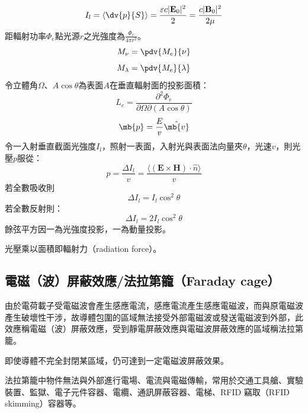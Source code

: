 \documentclass[a4paper,12pt]{report}
\begin{document}
\begin{itemize}
\eit
\[I_l=\langle\dv{p}{S}\rangle=\frac{\varepsilon c|\mathbf{E}_0|^2}{2}=\frac{c|\mathbf{B}_0|^2}{2\mu}\]
距輻射功率$\Phi_e$點光源$r$之光強度為$\frac{\Phi_e}{4\pi r^2}$。
\[M_{\nu}=\pdv{M_e}{\nu}\]
\[M_{\lambda}=\pdv{M_e}{\lambda}\]
令立體角$\Omega$、$A\cos\theta$為表面$A$在垂直輻射面的投影面積：
\[L_e=\frac{\partial^2\Phi_e}{\partial\Omega\partial(A\cos\theta)}\]
\[\mb{p}=\frac{E}{v}\hat{\mb{v}}\]
令一入射垂直截面光強度$I_l$，照射一表面，入射光與表面法向量夾$\theta$，光速$v$，則光壓$p$服從：
\[p=\frac{\Delta I_l}{v}=\frac{\langle(\mathbf{E}\times\mathbf{H})\cdot\hat{n}\rangle}{v}\]
若全數吸收則
\[\Delta I_l=I_l\cos^2\theta\]
若全數反射則：
\[\Delta I_l=2I_l\cos^2\theta\]
餘弦平方因一為光強度投影，一為動量投影。

光壓乘以面積即輻射力（radiation force）。
\subsection{電磁（波）屏蔽效應/法拉第籠（Faraday cage）}
由於電荷載子受電磁波會產生感應電流，感應電流產生感應電磁波，而與原電磁波產生破壞性干涉，故導體包圍的區域無法接受外部電磁波或發送電磁波到外部，此效應稱電磁（波）屏蔽效應，受到靜電屏蔽效應與電磁波屏蔽效應的區域稱法拉第籠。

即使導體不完全封閉某區域，仍可達到一定電磁波屏蔽效果。

法拉第籠中物件無法與外部進行電場、電流與電磁傳輸，常用於交通工具艙、實驗裝置、監獄、電子元件容器、電纜、通訊屏蔽容器、電梯、RFID 竊取（RFID skimming）容器等。

\end{itemize}
\end{document}
